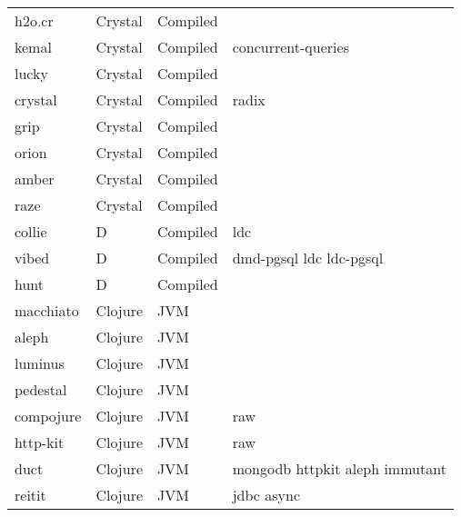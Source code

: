 \begin{longtable}{llll}
    h2o.cr           & Crystal & Compiled     &                                                    \\
    kemal            & Crystal & Compiled     & concurrent-queries                                 \\
    lucky            & Crystal & Compiled     &                                                    \\
    crystal          & Crystal & Compiled     & radix                                              \\
    grip             & Crystal & Compiled     &                                                    \\
    orion            & Crystal & Compiled     &                                                    \\
    amber            & Crystal & Compiled     &                                                    \\
    raze             & Crystal & Compiled     &                                                    \\
    collie           & D & Compiled          & ldc                                                \\
    vibed            & D & Compiled          & dmd-pgsql ldc ldc-pgsql                            \\
    hunt             & D & Compiled          &                                                    \\
    macchiato        & Clojure & JVM     &                                                    \\
    aleph            & Clojure & JVM     &                                                    \\
    luminus          & Clojure & JVM     &                                                    \\
    pedestal         & Clojure & JVM     &                                                    \\
    compojure        & Clojure & JVM     & raw                                                \\
    http-kit         & Clojure & JVM     & raw                                                \\
    duct             & Clojure & JVM     & mongodb httpkit aleph immutant                     \\
    reitit           & Clojure & JVM     & jdbc async                                         \\

\end{longtable}

